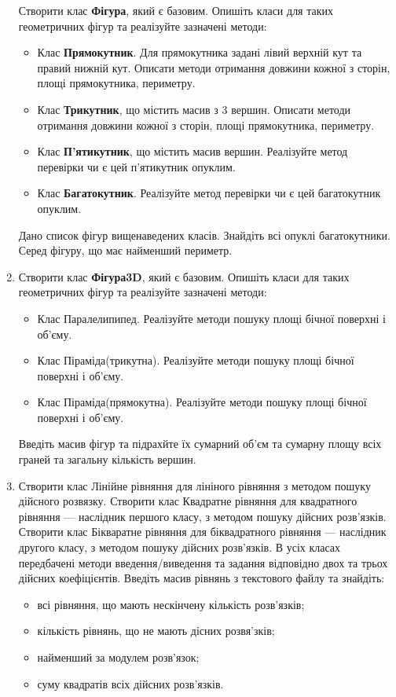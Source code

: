 \documentclass[]{article}
\begin{document}
\begin{enumerate}
Створити клас \textbf{Фігура}, який є базовим.  Опишіть класи для 
таких геометричних фігур та реалізуйте зазначені методи:
\begin{itemize}
\item
Клас \textbf{Прямокутник}. 
Для прямокутника задані лівий верхній кут та правий нижній кут.
Описати методи отримання довжини кожної з сторін, площі прямокутника,
периметру. 
\item
Клас \textbf{ Трикутник}, що містить масив з 3 вершин. 
Описати методи отримання довжини кожної з сторін, площі прямокутника,
периметру. 
\item
Клас \textbf{ П'ятикутник}, що містить масив вершин. 
Реалізуйте метод перевірки чи є цей п'ятикутник опуклим.
\item
Клас \textbf{ Багатокутник}. 
Реалізуйте метод перевірки чи є цей багатокутник опуклим.
\end{itemize}
Дано список фігур вищенаведених класів. Знайдіть всі опуклі багатокутники.
Серед фігуру, що має найменший периметр.

\item

Створити клас \textbf{Фігура3D}, який є базовим.  Опишіть класи для 
таких геометричних фігур та реалізуйте зазначені методи:
\begin{itemize}
\item
  Клас Паралелипипед. Реалізуйте методи пошуку площі бічної поверхні і
  об'єму.
\item
  Клас Піраміда(трикутна). Реалізуйте методи пошуку площі бічної поверхні і
  об'єму.
\item
  Клас Піраміда(прямокутна). Реалізуйте методи пошуку площі бічної поверхні і
  об'єму.
\end{itemize}
Введіть масив фігур та підрахйте їх сумарний об'єм та сумарну площу всіх граней 
та загальну кількість вершин.

\item
Створити клас Лінійне рівняння для лініного рівняння з методом пошуку дійсного розвязку.
Створити клас Квадратне рівняння для квадратного рівняння --- наслідник першого класу,
з методом пошуку дійсних розв'язків.
Створити клас Бікваратне рівняння для біквадратного рівняння --- наслідник другого класу,
з методом пошуку дійсних розв'язків. В усіх класах передбачені методи введення/виведення та задання 
відповідно двох та трьох дійсних коефіцієнтів.
Введіть масив рівнянь з текстового файлу та знайдіть:
\begin{itemize}
\item
всі рівняння, що мають нескінчену кількість розв'язків;
\item
кількість рівнянь, що не мають дісних розвя'зків;
\item
найменший за модулем розв'язок;
\item
суму квадратів всіх дійсних розв'язків.
\end{itemize}


\end{enumerate}
\end{document}
